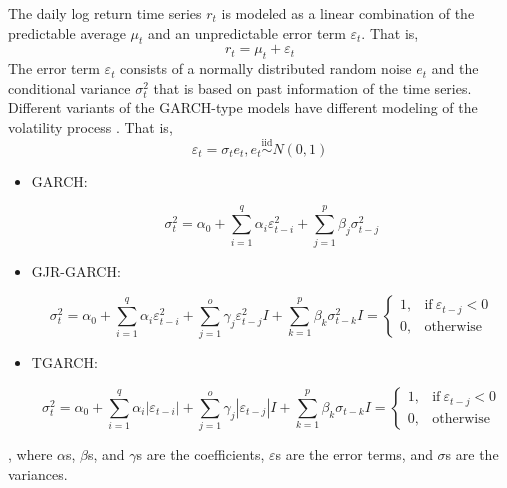 The daily log return time series $r_t$ is modeled as a linear combination of the predictable average $\mu_t$ and an unpredictable error term $\varepsilon_t$. That is, 
\begin{equation}
  r_t = \mu _t + \varepsilon _t
\end{equation}
The error term $\varepsilon_t$ consists of a normally distributed random noise $e_t$ and the conditional variance $\sigma _t^2$ that is based on past information of the time series. Different variants of the GARCH-type models have different modeling of the volatility process \cite{bollerslev_generalized_1986, glosten_relation_1993, zakoian_threshold_1994, sheppard_bashtagearch_2023}. That is, 
\begin{equation}
  \varepsilon_t = \sigma_t e_t, 
  e_t \overset{\mathrm{iid}}{\sim} N(0,1)
\end{equation}

\begin{itemize}
\item {GARCH}: 

\begin{equation}
  \sigma_t^2 = \alpha_0 
  + \sum_{i=1}^{q} \alpha_i \varepsilon_{t-i}^2
  + \sum_{j=1}^{p} \beta_j \sigma_{t-j}^2
\end{equation}

\item {GJR-GARCH}: 

\begin{subequations}
\begin{equation}
  \sigma_t^2 = \alpha_0 
  + \sum_{i=1}^{q} \alpha_i \varepsilon_{t-i}^2
  + \sum_{j=1}^{o} \gamma_j \varepsilon_{t-j}^2 I
  + \sum_{k=1}^{p} \beta_k \sigma_{t-k}^2
\end{equation}
\begin{equation}
  I=
    \begin{cases}
      1, & \text{if}\ \varepsilon _{t-j} < 0 \\
      0, & \text{otherwise}
    \end{cases}
\end{equation}
\end{subequations}

\item {TGARCH}: 

\begin{subequations}
\begin{equation}
  \sigma_t^2 = \alpha_0 
  + \sum_{i=1}^{q} \alpha_i |\varepsilon_{t-i}|
  + \sum_{j=1}^{o} \gamma_j |\varepsilon_{t-j}| I
  + \sum_{k=1}^{p} \beta_k \sigma_{t-k}
\end{equation}
\begin{equation}
  I=
    \begin{cases}
      1, & \text{if}\ \varepsilon _{t-j} < 0 \\
      0, & \text{otherwise}
    \end{cases}
\end{equation}
\end{subequations}

\end{itemize}
, where $\alpha$s, $\beta$s, and $\gamma$s are the coefficients, $\varepsilon$s are the error terms, and $\sigma$s are the variances. 

